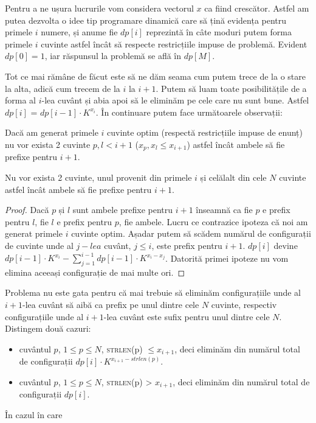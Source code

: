 Pentru a ne ușura lucrurile vom considera vectorul $x$ ca fiind crescător. Astfel am putea dezvolta o idee tip programare dinamică care să țină evidența pentru primele $i$ numere, și anume fie $dp[i]$ reprezintă în câte moduri putem forma primele $i$ cuvinte astfel încât să respecte restricțiile impuse de problemă. Evident $dp[0]=1$, iar răspunsul la problemă se află în $dp[M]$.

Tot ce mai rămâne de făcut este să ne dăm seama cum putem trece de la o stare la alta, adică cum trecem de la $i$ la $i + 1$. Putem să luam toate posibilitățile de a forma al $i$-lea cuvânt și abia apoi să le eliminăm pe cele care nu sunt bune. Astfel $dp[i]$ = $dp[i-1] \cdot K^{x_i}$. În continuare putem face următoarele observații:
\begin{observation}
Dacă am generat primele $i$ cuvinte optim (respectă restricțiile impuse de enunț) nu vor exista 2 cuvinte $p,l < i+1$ ($x_p, x_l \leq x_{i+1}$) astfel încât ambele să fie prefixe pentru $i+1$.
\end{observation}
\begin{observation}
Nu vor exista 2 cuvinte, unul provenit din primele $i$ și celălalt din cele $N$ cuvinte astfel încât ambele să fie prefixe pentru $i+1$. 
\end{observation}
\begin{proof}
Dacă $p$ și $l$ sunt ambele prefixe pentru $i+1$ înseamnă ca fie $p$ e prefix pentru $l$, fie $l$ e prefix pentru $p$, fie ambele. Lucru ce contrazice ipoteza că noi am generat primele $i$ cuvinte optim. Așadar putem să scădem numărul de configurații de cuvinte unde al $j-lea$ cuvânt, $j \leq i$, este prefix pentru $i+1$. $dp[i]$ devine $dp[i-1] \cdot K^{x_i} - \sum_{j=1}^{i-1} dp[i-1]\cdot K^{x_i - x_j}$. Datorită primei ipoteze nu vom elimina aceeași configurație de mai multe ori.
\end{proof}

Problema nu este gata pentru că mai trebuie să eliminăm configurațiile unde al $i+1$-lea cuvânt să aibă ca prefix pe unul dintre cele $N$ cuvinte, respectiv configurațiile unde al $i+1$-lea cuvânt este sufix pentru unul dintre cele $N$.
Distingem două cazuri: 
\begin{itemize}
    \item cuvântul $p$, $1 \leq p \leq N$, \textsc{strlen}(p) $\leq x_{i+1}$, deci eliminăm din numărul total de configurații $dp[i] \cdot K^{x_{i+1} - strlen(p)}$. 
    \item cuvântul $p$, $1 \leq p \leq N$, \textsc{strlen}(p) > $x_{i+1}$, deci eliminăm din numărul total de configurații $dp[i]$.
\end{itemize}
În cazul în care 

